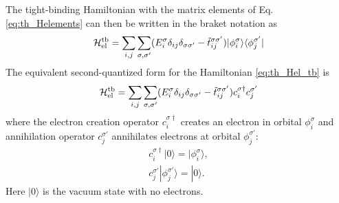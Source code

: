 The tight-binding Hamiltonian with the matrix elements of Eq. \eqref{eq:th_Helements} can then be written in the braket notation \cite{schwabl} as 
\begin{equation}
 \mathcal{H}_{\textrm{el}}^{\textrm{tb}} = \sum_{i,j} \sum_{\sigma,\sigma'} (E_i^{\sigma} \delta_{ij}\delta_{\sigma\sigma'}  - \tilde t_{ij}^{\sigma\sigma'})|\phi_i^{\sigma} \rangle \langle \phi_j^{\sigma'} | \label{eq:th_Hel_tb}
\end{equation}
The equivalent second-quantized form \cite{schwabl} for the Hamiltonian \eqref{eq:th_Hel_tb} is
\begin{equation}
 \mathcal{H}_{\textrm{el}}^{\textrm{tb}} = \sum_{i,j} \sum_{\sigma,\sigma'} (E_i^{\sigma} \delta_{ij}\delta_{\sigma\sigma'}  - \tilde t_{ij}^{\sigma\sigma'}) c_i^{\sigma\dagger} c_j^{\sigma'} \label{eq:th_Hel_tb_final}
\end{equation}
where the electron creation operator $c_i^{\sigma\dagger}$ creates an electron in orbital $\phi_i^{\sigma}$ and annihilation operator $c_j^{\sigma'}$ annihilates electrons at orbital $\phi_j^{\sigma'}$:
 \begin{subequations}
  \begin{align} 
     c_i^{\sigma\dagger} |0 \rangle = | \phi_i^{\sigma} \rangle,  \\
     c_j^{\sigma'} |\phi_j^{\sigma'} \rangle = | 0 \rangle.
  \end{align}
 \end{subequations}
Here $|0\rangle$ is the vacuum state with no electrons. 





